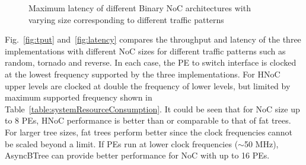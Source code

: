 \begin{figure}[t]
\centering     %
{}
\vspace{-3mm}
\caption{Maximum latency of different Binary NoC architectures with varying size corresponding to different traffic patterns}
\vspace{-5mm}
\label{fig:latmax}
\end{figure}

Fig.~\ref{fig:tput} and~\ref{fig:latency} compares the throughput and latency of the three implementations with different NoC sizes for different traffic patterns such as random, tornado and reverse.
In each case, the PE to switch interface is clocked at the lowest frequency supported by the three implementations.
For HNoC upper levels are clocked at double the frequency of lower levels, but limited by maximum supported frequency shown in Table~\ref{table:systemResourceConsumption}.
It could be seen that for NoC size up to 8 PEs, HNoC performance is better than or comparable to that of fat trees.
For larger tree sizes, fat trees perform better since the clock frequencies cannot be scaled beyond a limit.
If PEs run at lower clock frequencies ($\sim$50 MHz), AsyncBTree can provide better performance for NoC with up to 16 PEs. 

